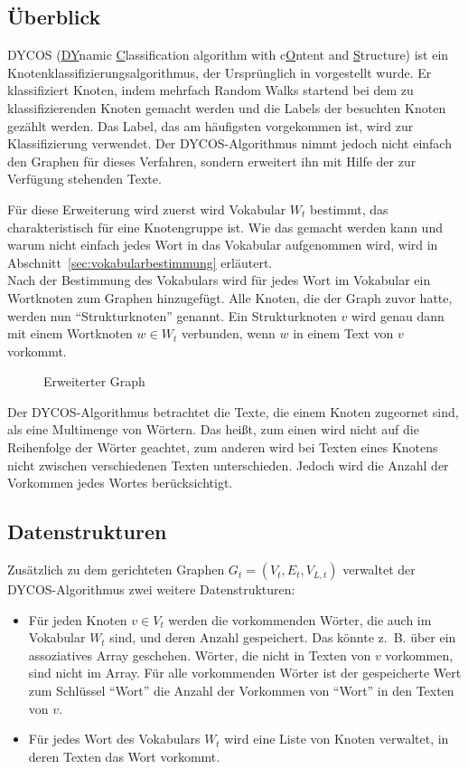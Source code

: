 \subsection{Überblick}
DYCOS (\underline{DY}namic \underline{C}lassification 
algorithm with c\underline{O}ntent and \underline{S}tructure) ist ein 
Knotenklassifizierungsalgorithmus, der Ursprünglich in \cite{aggarwal2011} vorgestellt 
wurde. Er klassifiziert Knoten, indem mehrfach Random Walks startend
bei dem zu klassifizierenden Knoten gemacht werden und die Labels
der besuchten Knoten gezählt werden. Das Label, das am häufigsten
vorgekommen ist, wird zur Klassifizierung verwendet.
Der DYCOS-Algorithmus nimmt jedoch nicht einfach den Graphen für 
dieses Verfahren, sondern erweitert ihn mit Hilfe der zur Verfügung
stehenden Texte.

Für diese Erweiterung wird zuerst wird Vokabular $W_t$ bestimmt, das 
charakteristisch für eine Knotengruppe ist. Wie das gemacht werden kann
und warum nicht einfach jedes Wort in das Vokabular aufgenommen wird,
wird in Abschnitt~\ref{sec:vokabularbestimmung} erläutert.\\
Nach der Bestimmung des Vokabulars wird für 
jedes Wort im Vokabular ein Wortknoten zum Graphen hinzugefügt. Alle
Knoten, die der Graph zuvor hatte, werden nun \enquote{Strukturknoten}
genannt.
Ein Strukturknoten $v$ wird genau dann mit einem Wortknoten $w \in W_t$
verbunden, wenn $w$ in einem Text von $v$ vorkommt.

\begin{figure}[htp]
    \centering
    
    \caption{Erweiterter Graph}
    \label{fig:erweiterter-graph}
\end{figure}

Der DYCOS-Algorithmus betrachtet die Texte, die einem Knoten 
zugeornet sind, als eine
Multimenge von Wörtern. Das heißt, zum einen wird nicht auf die
Reihenfolge der Wörter geachtet, zum anderen wird bei Texten
eines Knotens nicht zwischen verschiedenen Texten unterschieden.
Jedoch wird die Anzahl der Vorkommen jedes Wortes berücksichtigt.

\subsection{Datenstrukturen}
Zusätzlich zu dem gerichteten Graphen $G_t = (V_t, E_t, V_{L,t})$ 
verwaltet der DYCOS-Algorithmus zwei weitere Datenstrukturen:
\begin{itemize}
    \item Für jeden Knoten $v \in V_t$ werden die vorkommenden Wörter,
          die auch im Vokabular $W_t$ sind,
          und deren Anzahl gespeichert. Das könnte z.~B. über ein 
          assoziatives Array geschehen. Wörter, die nicht in 
          Texten von $v$ vorkommen, sind nicht im Array. Für
          alle vorkommenden Wörter ist der gespeicherte Wert zum 
          Schlüssel \enquote{Wort} die Anzahl der Vorkommen von 
          \enquote{Wort} in den Texten von $v$.
    \item Für jedes Wort des Vokabulars $W_t$ wird eine Liste von 
          Knoten verwaltet, in deren Texten das Wort vorkommt.
\end{itemize}

